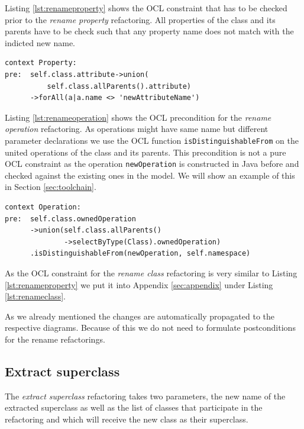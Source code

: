 \documentclass{llncs}
\begin{document}
Listing \ref{lst:renameproperty} shows the OCL constraint that has to be checked prior to the \textit{rename property} 
refactoring. All properties of the class and its parents have to be check such that any property name does not match 
with the indicted new name.

\begin{lstlisting}[language=OCL,caption=OCL for rename property,label=lst:renameproperty]
context Property:
pre:  self.class.attribute->union(
          self.class.allParents().attribute)
      ->forAll(a|a.name <> 'newAttributeName')
\end{lstlisting}

Listing \ref{lst:renameoperation} shows the OCL precondition for the \textit{rename operation} refactoring. As operations 
might have same name but different parameter declarations we use the OCL function \texttt{isDistinguishableFrom} on the 
united operations of the class and its parents. This precondition is not a pure OCL constraint as the operation \texttt{newOperation} 
is constructed in Java before and checked against the existing ones in the model. We will show an example of this in 
Section \ref{sec:toolchain}.

\begin{lstlisting}[language=OCL,caption=OCL for rename operation,label=lst:renameoperation]
context Operation:
pre:  self.class.ownedOperation
      ->union(self.class.allParents()
              ->selectByType(Class).ownedOperation)
      .isDistinguishableFrom(newOperation, self.namespace)
\end{lstlisting}

As the OCL constraint for the \textit{rename class} refactoring is very similar to Listing \ref{lst:renameproperty} 
we put it into Appendix \ref{sec:appendix} under Listing \ref{lst:renameclass}.

As we already mentioned the changes are automatically propagated to the respective diagrams. Because of this we do 
not need to formulate postconditions for the rename refactorings.

\subsection{Extract superclass}
\label{sec:extract}
The \textit{extract superclass} refactoring takes two parameters, the new name of the extracted superclass as well as
the list of classes that participate in the refactoring and which will receive the new class as their superclass.
\end{document}
